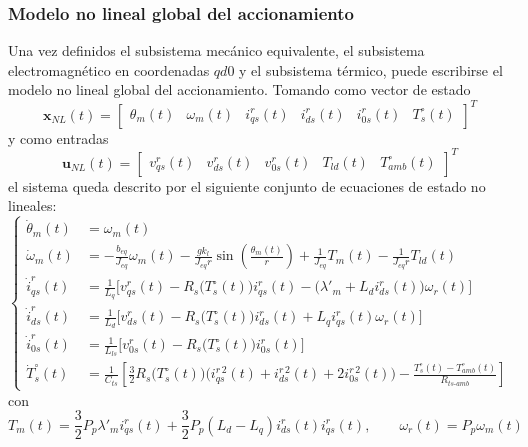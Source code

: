 \documentclass[12pt, a4paper,journal, onecolumn, compsoc]{IEEEtran}
\begin{document}
    \subsubsection{Modelo no lineal global del accionamiento}
    Una vez definidos el subsistema mecánico equivalente, el subsistema electromagnético en coordenadas \(qd0\) y el subsistema térmico, puede escribirse el modelo no lineal global del accionamiento. Tomando como vector de estado
    \[
        \mathbf{x}_{NL}(t)=\begin{bmatrix}
            \theta_m(t) & \omega_m(t) & i_{qs}^r(t) & i_{ds}^r(t) & i_{0s}^r(t) & T_s^\circ(t)
        \end{bmatrix}^T
    \]
    y como entradas
    \[
        \mathbf{u}_{NL}(t)=\begin{bmatrix}
            v_{qs}^r(t) & v_{ds}^r(t) & v_{0s}^r(t) & T_{ld}(t) & T_{amb}^\circ(t)
        \end{bmatrix}^T
    \]
    el sistema queda descrito por el siguiente conjunto de ecuaciones de estado no lineales:
    \begin{equation}
    \left\{
        \begin{aligned}
            \dot{\theta}_m(t) &= \omega_m(t) \\[6pt]
            \dot{\omega}_m(t) &= -\frac{b_{eq}}{J_{eq}}\omega_m(t)-\frac{gk_l}{J_{eq}r}\sin\left(\frac{\theta_m(t)}{r}\right)+\frac{1}{J_{eq}}T_m(t)-\frac{1}{J_{eq}r}T_{ld}(t) \\[6pt]
            \dot{i}_{qs}^r(t) &= \frac{1}{L_q}\Big[v_{qs}^r(t)-R_s\big(T_s^\circ(t)\big)i_{qs}^r(t)-\big(\lambda'_m+L_d i_{ds}^r(t)\big)\omega_r(t)\Big] \\[6pt]
            \dot{i}_{ds}^r(t) &= \frac{1}{L_d}\Big[v_{ds}^r(t)-R_s\big(T_s^\circ(t)\big)i_{ds}^r(t)+L_q i_{qs}^r(t)\omega_r(t)\Big] \\[6pt]
            \dot{i}_{0s}^r(t) &= \frac{1}{L_{ls}}\Big[v_{0s}^r(t)-R_s\big(T_s^\circ(t)\big)i_{0s}^r(t)\Big] \\[6pt]
            \dot{T}_s^\circ(t) &= \frac{1}{C_{ts}}\left[\frac{3}{2}R_s\big(T_s^\circ(t)\big)\Big(i_{qs}^{r\,2}(t)+i_{ds}^{r\,2}(t)+2i_{0s}^{r\,2}(t)\Big)-\frac{T_s^\circ(t)-T_{amb}^\circ(t)}{R_{ts\text{-}amb}}\right]
        \end{aligned}
    \right.
    \end{equation}
    con
    \begin{equation}
        T_m(t)=\frac{3}{2} P_p \lambda'_m i_{qs}^r(t)+\frac{3}{2}P_p(L_d-L_q)i_{ds}^r(t)i_{qs}^r(t),
        \qquad
        \omega_r(t)=P_p\omega_m(t)
    \end{equation}
\end{document}
